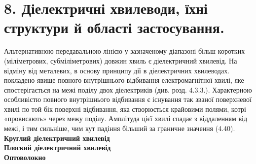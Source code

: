 \documentclass[a4paper,14pt]{extreport}
\begin{document}
\section{8. Діелектричні хвилеводи, їхні структури й області застосування.}
Альтернативною передавальною лінією у зазначеному
діапазоні більш коротких (міліметрових, субміліметрових) довжин хвиль є діелектричний хвилевід. На відміну від металевих, в основу принципу дії в діелектричних хвилеводах. покладено явище повного внутрішнього
відбивання електромагнітної хвилі, яке спостерігається на межі
поділу двох діелектриків (див. розд. 4.3.3.).
Характерною особливістю
повного внутрішнього відбивання є існування так званої поверхневої
хвилі по той бік поверхні відбивання, яка створюється крайовими
полями, котрі «провисають» через межу поділу. Амплітуда цієї
хвилі спадає з віддаленням від межі, і тим сильніше, чим кут
падіння більший за граничне значення (4.40).\\
\textbf{Круглий діелектричний хвилевід}\\
\textbf{Плоский діелектричний хвилевід}\\
\textbf{Оптоволокно}\\
\end{document}
